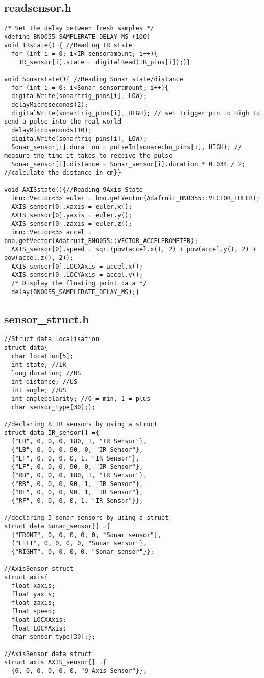 \subsection{readsensor.h}
\begin{lstlisting}
/* Set the delay between fresh samples */
#define BNO055_SAMPLERATE_DELAY_MS (100)
void IRstate() { //Reading IR state
  for (int i = 0; i<IR_sensoramount; i++){
    IR_sensor[i].state = digitalRead(IR_pins[i]);}}

void Sonarstate(){ //Reading Sonar state/distance
  for (int i = 0; i<Sonar_sensoramount; i++){
  digitalWrite(sonartrig_pins[i], LOW); 
  delayMicroseconds(2);
  digitalWrite(sonartrig_pins[i], HIGH); // set trigger pin to High to send a pulse into the real world
  delayMicroseconds(10);
  digitalWrite(sonartrig_pins[i], LOW); 
  Sonar_sensor[i].duration = pulseIn(sonarecho_pins[i], HIGH); // measure the time it takes to receive the pulse
  Sonar_sensor[i].distance = Sonar_sensor[i].duration * 0.034 / 2; //calculate the distance in cm}}

void AXISstate(){//Reading 9Axis State
  imu::Vector<3> euler = bno.getVector(Adafruit_BNO055::VECTOR_EULER);
  AXIS_sensor[0].xaxis = euler.x();
  AXIS_sensor[0].yaxis = euler.y();
  AXIS_sensor[0].zaxis = euler.z();
  imu::Vector<3> accel = bno.getVector(Adafruit_BNO055::VECTOR_ACCELEROMETER);
  AXIS_sensor[0].speed = sqrt(pow(accel.x(), 2) + pow(accel.y(), 2) + pow(accel.z(), 2));
  AXIS_sensor[0].LOCXAxis = accel.x();
  AXIS_sensor[0].LOCYAxis = accel.y();
  /* Display the floating point data */
  delay(BNO055_SAMPLERATE_DELAY_MS);}
\end{lstlisting}
\subsection{sensor\_struct.h}
\begin{lstlisting}
//Struct data localisation
struct data{
  char location[5];
  int state; //IR
  long duration; //US
  int distance; //US
  int angle; //US
  int anglepolarity; //0 = min, 1 = plus 
  char sensor_type[30];};

//declaring 8 IR sensors by using a struct
struct data IR_sensor[] ={
  {"LB", 0, 0, 0, 180, 1, "IR Sensor"},
  {"LB", 0, 0, 0, 90, 0, "IR Sensor"},
  {"LF", 0, 0, 0, 0, 1, "IR Sensor"},
  {"LF", 0, 0, 0, 90, 0, "IR Sensor"},
  {"RB", 0, 0, 0, 180, 1, "IR Sensor"},
  {"RB", 0, 0, 0, 90, 1, "IR Sensor"},
  {"RF", 0, 0, 0, 90, 1, "IR Sensor"},
  {"RF", 0, 0, 0, 0, 1, "IR Sensor"}};

//declaring 3 sonar sensors by using a struct
struct data Sonar_sensor[] ={ 
  {"FRONT", 0, 0, 0, 0, 0, "Sonar sensor"},
  {"LEFT", 0, 0, 0, 0, "Sonar sensor"},
  {"RIGHT", 0, 0, 0, 0, "Sonar sensor"}};

//AxisSensor struct
struct axis{
  float xaxis;
  float yaxis;
  float zaxis;
  float speed;
  float LOCXAxis;
  float LOCYAxis;
  char sensor_type[30];};

//AxisSensor data struct
struct axis AXIS_sensor[] ={
  {0, 0, 0, 0, 0, 0, "9 Axis Sensor"}};
\end{lstlisting}
